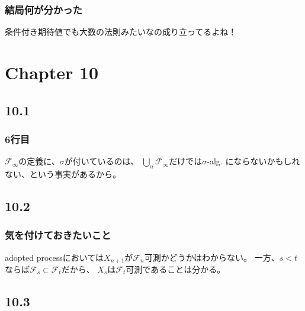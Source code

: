       \subsubsection{結局何が分かった}
        条件付き期待値でも大数の法則みたいなの成り立ってるよね！

  \section{Chapter 10}
    \subsection{10.1}
      \subsubsection{6行目}
        $\mathcal{F}_{\infty}$の定義に、$\sigma$が付いているのは、
        $\bigcup_n \mathcal{F}_{\infty}$だけでは$\sigma$-alg.
        にならないかもしれない、という事実があるから。

    \subsection{10.2}
      \subsubsection{気を付けておきたいこと}
        adopted processにおいては$X_{n+1}$が$\mathcal{F}_n$可測かどうかはわからない。
        一方、$s < t$ならば$\mathcal{F}_s \subset \mathcal{F}_t$だから、
        $X_s$は$\mathcal{F}_t$可測であることは分かる。

    \subsection{10.3}
